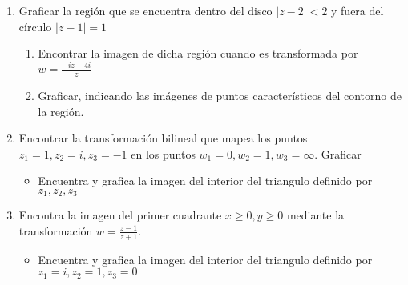 \documentclass[12pt]{article}
\begin{document}
\begin{enumerate}
\item Graficar la región que se encuentra dentro del disco $\left| z - 2\right| < 2$ y fuera del círculo $\left| z -1 \right| = 1 $
\begin{enumerate}
\item Encontrar la imagen de dicha región cuando es transformada por $w=\frac{-iz+4i}{z}$
\item Graficar, indicando las imágenes de puntos característicos del contorno de la región.
\end{enumerate}
\item Encontrar la transformación bilineal que mapea los puntos  $z_1 = 1, z_2=i, z_3 = -1$ en los puntos $w_1 = 0, w_2 = 1, w_3 = \infty$. Graficar
\begin{itemize}
\item Encuentra y grafica la imagen del interior del triangulo definido por  $z_1, z_2, z_3$
\end{itemize}
\item Encontra la imagen del primer cuadrante $x \geqslant 0, y \geqslant 0$ mediante la transformación $w = \frac{z-1}{z+1}$.
\begin{itemize}
\item Encuentra y grafica la imagen del interior del triangulo definido por  $z_1 = i, z_2 = 1, z_3 = 0$
\end{itemize}
\end{enumerate}

\end{document}
